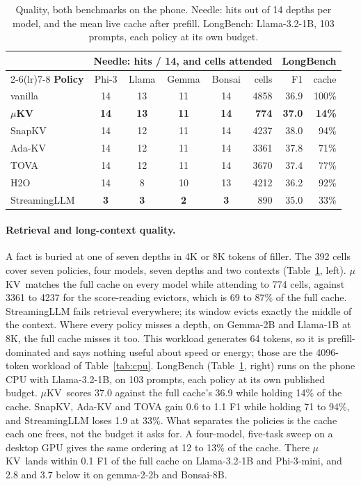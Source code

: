 \documentclass[sigconf, anonymous=false, screen=true, 10pt]{acmart}
\newcommand{\good}[1]{\textcolor{kvgreen}{\textbf{#1}}}
\newcommand{\bad}[1]{\textcolor{kvred}{\textbf{#1}}}
\newcommand{\muKV}{$\mu$KV}
\begin{document}
\begin{table}[tb]
\caption{Quality, both benchmarks on the phone. Needle: hits out of 14 depths per model, and the mean live cache after prefill. LongBench: Llama-3.2-1B, 103 prompts, each policy at its own budget.}
\label{tab:quality}
\centering\scriptsize
\setlength{\tabcolsep}{2.4pt}
\begin{tabular}{l cccc r  rr}
\toprule
 & \multicolumn{5}{c}{\textbf{Needle: hits / 14, and cells attended}} & \multicolumn{2}{c}{\textbf{LongBench}} \\
\cmidrule(lr){2-6}\cmidrule(lr){7-8}
\textbf{Policy} & Phi-3 & Llama & Gemma & Bonsai & cells & F1 & cache \\
\midrule
vanilla & 14 & 13 & 11 & 14 & 4858 & 36.9 & 100\% \\
\textbf{\muKV} & \good{14} & \good{13} & \good{11} & \good{14} & \good{774} & \good{37.0} & \good{14\%} \\
SnapKV & 14 & 12 & 11 & 14 & 4237 & 38.0 & 94\% \\
Ada-KV & 14 & 12 & 11 & 14 & 3361 & 37.8 & 71\% \\
TOVA & 14 & 12 & 11 & 14 & 3670 & 37.4 & 77\% \\
H2O & 14 & 8 & 10 & 13 & 4212 & 36.2 & 92\% \\
StreamingLLM & \bad{3} & \bad{3} & \bad{2} & \bad{3} & 890 & 35.0 & 33\% \\
\bottomrule
\end{tabular}
\end{table}

\paragraph{Retrieval and long-context quality.} A fact is buried at one of seven depths in 4K or 8K tokens of filler. The 392 cells cover seven policies, four models, seven depths and two contexts (Table~\ref{tab:quality}, left). \muKV\ matches the full cache on every model while attending to 774 cells, against 3361 to 4237 for the score-reading evictors, which is 69 to 87\% of the full cache. StreamingLLM fails retrieval everywhere; its window evicts exactly the middle of the context. Where every policy misses a depth, on Gemma-2B and Llama-1B at 8K, the full cache misses it too. This workload generates 64 tokens, so it is prefill-dominated and says nothing useful about speed or energy; those are the 4096-token workload of Table~\ref{tab:cpu}. LongBench (Table~\ref{tab:quality}, right) runs on the phone CPU with Llama-3.2-1B, on 103 prompts, each policy at its own published budget. \muKV\ scores 37.0 against the full cache's 36.9 while holding 14\% of the cache. SnapKV, Ada-KV and TOVA gain 0.6 to 1.1 F1 while holding 71 to 94\%, and StreamingLLM loses 1.9 at 33\%. What separates the policies is the cache each one frees, not the budget it asks for. A four-model, five-task sweep on a desktop GPU gives the same ordering at 12 to 13\% of the cache. There \muKV\ lands within 0.1 F1 of the full cache on Llama-3.2-1B and Phi-3-mini, and 2.8 and 3.7 below it on gemma-2-2b and Bonsai-8B.
\end{document}
